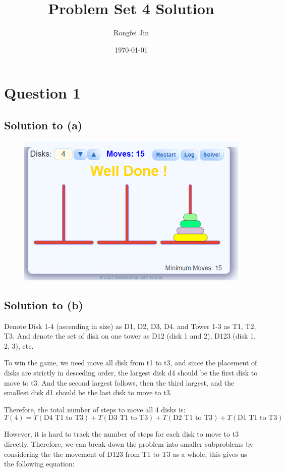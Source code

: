 \documentclass{article}
\title{Problem Set 4 Solution}
\author{Rongfei Jin}
\date{\today}
\begin{document}
\section*{Question 1}
\subsection*{Solution to (a)}
\begin{figure}[h]
\includegraphics[scale=0.4]{1-1.png}
\end{figure}

\subsection*{Solution to (b)}
    
Denote Disk 1-4 (ascending in size) as D1, D2, D3, D4. and Tower 1-3 as T1, T2, T3. And denote the set of disk on one tower as D12 (disk 1 and 2), D123 (disk 1, 2, 3), etc.

\vspace{3mm}

To win the game, we need move all disk from t1 to t3, and since the placement of disks are strictly in desceding order, the largest disk d4 should be the first disk to move to t3. And the second largest follows, then the third largest, and the smallest disk d1 should be the last disk to move to t3.

Therefore, the total number of steps to move all 4 disks is:
\[T(4) = T(\text{D4 T1 to T3}) + T(\text{D3 T1 to T3}) + T(\text{D2 T1 to T3}) + T(\text{D1 T1 to T3})\]

However, it is hard to track the number of steps for each disk to move to t3 directly. Therefore, we can break down the problem into smaller subproblems by considering the the movement of D123 from T1 to T3 as a whole, this gives us the following equation:
\end{document}
